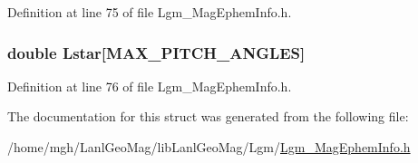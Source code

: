 Definition at line 75 of file Lgm\_\-MagEphemInfo.h.\hypertarget{struct_lgm___mag_ephem_info_eb65115ebb3c6fc78a0250c76c345475}{
\subsubsection[{Lstar}]{\setlength{\rightskip}{0pt plus 5cm}double {\bf Lstar}\mbox{[}MAX\_\-PITCH\_\-ANGLES\mbox{]}}}
\label{struct_lgm___mag_ephem_info_eb65115ebb3c6fc78a0250c76c345475}




Definition at line 76 of file Lgm\_\-MagEphemInfo.h.

The documentation for this struct was generated from the following file:\begin{CompactItemize}
\item 
/home/mgh/LanlGeoMag/libLanlGeoMag/Lgm/\hyperlink{_lgm___mag_ephem_info_8h}{Lgm\_\-MagEphemInfo.h}\end{CompactItemize}
